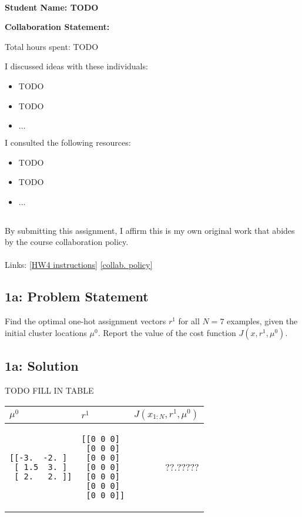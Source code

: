 \documentclass[10pt]{article}
\newcommand{\officialdirections}[1]{{\color{purple} #1}}
\begin{document}
~~\\ %

{\Large{\bf Student Name: TODO}}

\Large{\bf Collaboration Statement:}

Total hours spent: TODO

I discussed ideas with these individuals:
\begin{itemize}
\item TODO
\item TODO
\item $\ldots$	
\end{itemize}

I consulted the following resources:
\begin{itemize}
\item TODO
\item TODO
\item $\ldots$	
\end{itemize}
~~\\
By submitting this assignment, I affirm this is my own original work that abides by the course collaboration policy.
~~\\
~~\\
Links: 
\href{https://www.cs.tufts.edu/cs/136/2024s/hw4.html}{[HW4 instructions]} 
\href{https://www.cs.tufts.edu/cs/136/2024s/index.html#collaboration}{[collab. policy]} 

\tableofcontents

\newpage

\officialdirections{
\subsection*{1a: Problem Statement}
Find the optimal one-hot assignment vectors $r^1$ for all $N=7$ examples, given the initial cluster locations $\mu^0$. Report the value of the cost function $J(x, r^1, \mu^0)$.
}

\subsection{1a: Solution}
TODO FILL IN TABLE

\begin{tabular}{p{5cm} | p{5cm} | r}
$\mu^0$ & $r^1$ & $J(x_{1:N}, r^1, \mu^0)$
\\
\midrule
\begin{verbatim}
[[-3.  -2. ]
 [ 1.5  3. ]
 [ 2.   2. ]]
\end{verbatim}
&	
\begin{verbatim}
[[0 0 0]
 [0 0 0]
 [0 0 0]
 [0 0 0]
 [0 0 0]
 [0 0 0]
 [0 0 0]]
\end{verbatim}
&
 ??.?????
\end{tabular}
\end{document}

